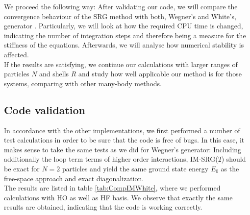 We proceed the following way: After validating our code, we will compare the convergence behaviour of the SRG method with both, Wegner's and White's, generator . Particularly, we will look at how the required CPU time is changed, indicating the number of integration steps and therefore being a measure for the stiffness of the equations. Afterwards, we will analyse how numerical stability is affected.\\
If the results are satisfying, we continue our calculations with larger ranges of particles $N$ and shells $R$ and study how well applicable our method is for those systems, comparing with other many-body methods.


\subsection{Code validation}
In accordance with the other implementations, we first performed a number of test calculations in order to be sure that the code is free of bugs. In this case, it makes sense to take the same tests as we did for Wegner's generator: Including additionally the loop term terms of higher order interactions, IM-SRG(2) should be exact for $N=2$ particles and yield the same ground state energy $E_0$ as the free-space approach and exact diagonalization.\\
The results are listed in table \ref{tab:CompIMWhite}, where we performed calculations with HO as well as HF basis. We observe that exactly the same results are obtained, indicating that the code is working correctly.

